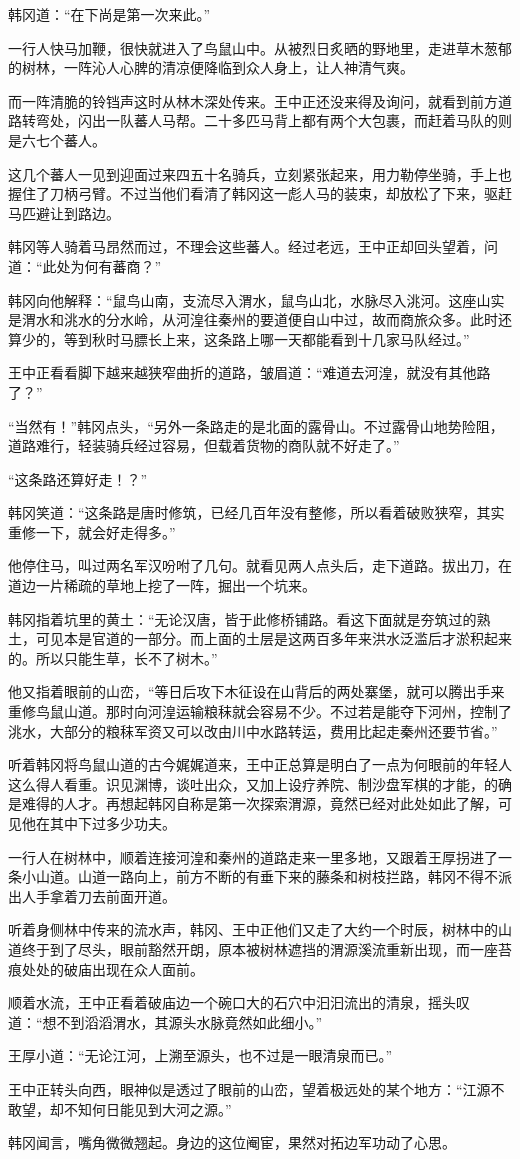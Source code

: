 韩冈道：“在下尚是第一次来此。”

一行人快马加鞭，很快就进入了鸟鼠山中。从被烈日炙晒的野地里，走进草木葱郁的树林，一阵沁人心脾的清凉便降临到众人身上，让人神清气爽。

而一阵清脆的铃铛声这时从林木深处传来。王中正还没来得及询问，就看到前方道路转弯处，闪出一队蕃人马帮。二十多匹马背上都有两个大包裹，而赶着马队的则是六七个蕃人。

这几个蕃人一见到迎面过来四五十名骑兵，立刻紧张起来，用力勒停坐骑，手上也握住了刀柄弓臂。不过当他们看清了韩冈这一彪人马的装束，却放松了下来，驱赶马匹避让到路边。

韩冈等人骑着马昂然而过，不理会这些蕃人。经过老远，王中正却回头望着，问道：“此处为何有蕃商？”

韩冈向他解释：“鼠鸟山南，支流尽入渭水，鼠鸟山北，水脉尽入洮河。这座山实是渭水和洮水的分水岭，从河湟往秦州的要道便自山中过，故而商旅众多。此时还算少的，等到秋时马膘长上来，这条路上哪一天都能看到十几家马队经过。”

王中正看看脚下越来越狭窄曲折的道路，皱眉道：“难道去河湟，就没有其他路了？”

“当然有！”韩冈点头，“另外一条路走的是北面的露骨山。不过露骨山地势险阻，道路难行，轻装骑兵经过容易，但载着货物的商队就不好走了。”

“这条路还算好走！？”

韩冈笑道：“这条路是唐时修筑，已经几百年没有整修，所以看着破败狭窄，其实重修一下，就会好走得多。”

他停住马，叫过两名军汉吩咐了几句。就看见两人点头后，走下道路。拔出刀，在道边一片稀疏的草地上挖了一阵，掘出一个坑来。

韩冈指着坑里的黄土：“无论汉唐，皆于此修桥铺路。看这下面就是夯筑过的熟土，可见本是官道的一部分。而上面的土层是这两百多年来洪水泛滥后才淤积起来的。所以只能生草，长不了树木。”

他又指着眼前的山峦，“等日后攻下木征设在山背后的两处寨堡，就可以腾出手来重修鸟鼠山道。那时向河湟运输粮秣就会容易不少。不过若是能夺下河州，控制了洮水，大部分的粮秣军资又可以改由川中水路转运，费用比起走秦州还要节省。”

听着韩冈将鸟鼠山道的古今娓娓道来，王中正总算是明白了一点为何眼前的年轻人这么得人看重。识见渊博，谈吐出众，又加上设疗养院、制沙盘军棋的才能，的确是难得的人才。再想起韩冈自称是第一次探索渭源，竟然已经对此处如此了解，可见他在其中下过多少功夫。

一行人在树林中，顺着连接河湟和秦州的道路走来一里多地，又跟着王厚拐进了一条小山道。山道一路向上，前方不断的有垂下来的藤条和树枝拦路，韩冈不得不派出人手拿着刀去前面开道。

听着身侧林中传来的流水声，韩冈、王中正他们又走了大约一个时辰，树林中的山道终于到了尽头，眼前豁然开朗，原本被树林遮挡的渭源溪流重新出现，而一座苔痕处处的破庙出现在众人面前。

顺着水流，王中正看着破庙边一个碗口大的石穴中汩汩流出的清泉，摇头叹道：“想不到滔滔渭水，其源头水脉竟然如此细小。”

王厚小道：“无论江河，上溯至源头，也不过是一眼清泉而已。”

王中正转头向西，眼神似是透过了眼前的山峦，望着极远处的某个地方：“江源不敢望，却不知何日能见到大河之源。”

韩冈闻言，嘴角微微翘起。身边的这位阉宦，果然对拓边军功动了心思。

